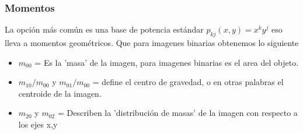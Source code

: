 \subsubsection{Momentos}
La opción más común es una base de potencia estándar \cite{Book:Jan2009} $p_{kj}(x,y) = x^k y^j$
eso lleva a momentos geométricos. Que para imagenes binarias obtenemos lo siguiente
\begin{itemize}
	\item $m_{00}$ =  Es la 'masa' de la imagen, para imagenes binarias es el area del objeto.
	\item $m_{10}/m_{00}$ y $m_{01}/m_{00}$ = define el centro de gravedad, o en otras palabras
	      el centroide de la imagen.
	\item $m_{20}$ y $m_{02}$ = Describen la 'distribución de masas' de la imagen con respecto a
	      los ejes x,y
\end{itemize}

